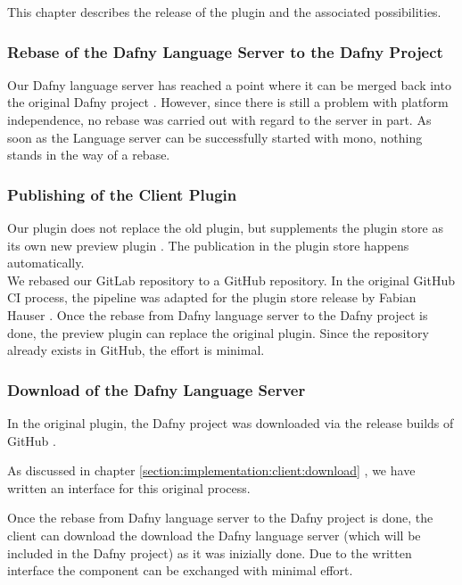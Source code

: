 This chapter describes the release of the plugin and the associated possibilities.

\subsubsection{Rebase of the Dafny Language Server to the Dafny Project}
Our Dafny language server has reached a point where it can be merged back into the original Dafny project \cite{dafny_lang_github}.
However, since there is still a problem with platform independence, no rebase was carried out with regard to the server in part.
As soon as the Language server can be successfully started with mono, nothing stands in the way of a rebase.

\subsubsection{Publishing of the Client Plugin}
Our plugin does not replace the old plugin, but supplements the plugin store as its own new preview plugin \cite{our-dafny-plugin}.
The publication in the plugin store happens automatically. \\

We rebased our GitLab repository to a GitHub repository.
In the original GitHub CI process, the pipeline 
was adapted for the plugin store release by Fabian Hauser \cite{our-dafny-plugin-github-publish}.
Once the rebase from Dafny language server to the Dafny project is done,
the preview plugin can replace the original plugin.
Since the repository already exists in GitHub, the effort is minimal.

\subsubsection{Download of the Dafny Language Server}
In the original plugin, the Dafny project was downloaded via the release builds of GitHub \cite{dafny_lang_builds}.

As discussed in chapter \ref{section:implementation:client:download} ,
we have written an interface for this original process.

Once the rebase from Dafny language server to the Dafny project is done,
the client can download the download the Dafny language server
(which will be included in the Dafny project) as it was inizially done.
Due to the written interface the component can be exchanged with minimal effort. \\

